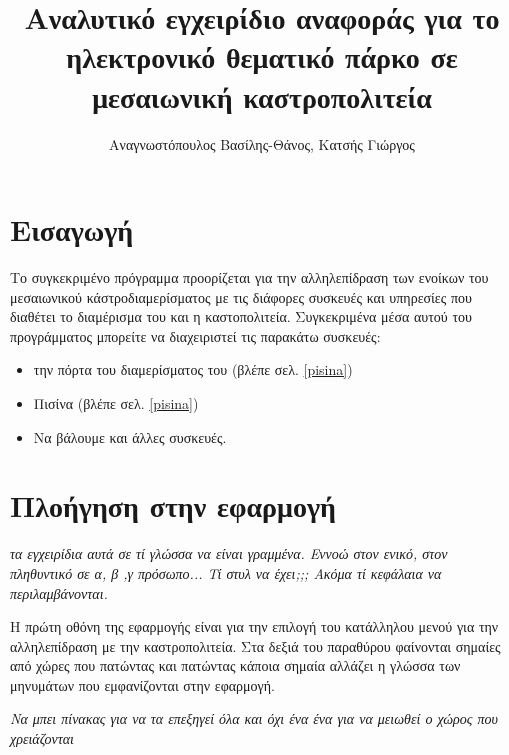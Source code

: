 \documentclass[a4paper,titlepage,twoside,12pt,leqno]{article}
\title{Αναλυτικό εγχειρίδιο αναφοράς για το ηλεκτρονικό θεματικό πάρκο σε μεσαιωνική καστροπολιτεία}
\author{Αναγνωστόπουλος Βασίλης-Θάνος, Κατσής Γιώργος}
\date{}
\begin{document}
\maketitle
\tableofcontents
\listoffigures
\listoftables
\newpage

\section{Εισαγωγή}


Το συγκεκριμένο πρόγραμμα προορίζεται για την αλληλεπίδραση των ενοίκων του μεσαιωνικού κάστροδιαμερίσματος με τις διάφορες συσκευές και υπηρεσίες που διαθέτει το διαμέρισμα του και η καστοπολιτεία. Συγκεκριμένα μέσα αυτού του προγράμματος μπορείτε να διαχειριστεί τις παρακάτω συσκευές:

\begin{itemize}
\item την πόρτα του διαμερίσματος του (βλέπε σελ. \ref{pisina})
\item Πισίνα (βλέπε σελ. \ref{pisina})
\item Να βάλουμε και άλλες συσκευές.

\end{itemize}

\section{Πλοήγηση στην εφαρμογή}

\emph{τα εγχειρίδια αυτά σε τί γλώσσα να είναι γραμμένα. Εννοώ στον ενικό, στον πληθυντικό σε α, β ,γ πρόσωπο... Τί στυλ να έχει;;; Ακόμα τί κεφάλαια να περιλαμβάνονται.}

Η πρώτη οθόνη της εφαρμογής είναι για την επιλογή του κατάλληλου μενού για την αλληλεπίδραση με την καστροπολιτεία. Στα δεξιά του παραθύρου φαίνονται σημαίες από χώρες που πατώντας και πατώντας κάποια σημαία αλλάζει η γλώσσα των μηνυμάτων που εμφανίζονται στην εφαρμογή.

\emph{Να μπει πίνακας για να τα επεξηγεί όλα και όχι ένα ένα για να μειωθεί ο χώρος που χρειάζονται}
\end{document}
